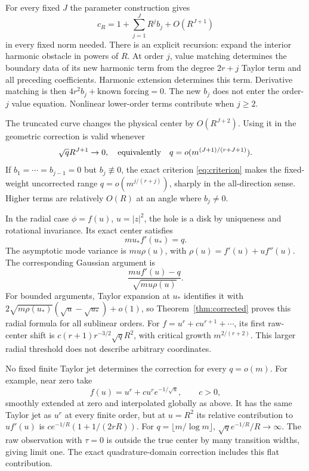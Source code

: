 \documentclass[11pt]{article}
\theoremstyle{remark}\newtheorem{remark}[theorem]{Remark}
\begin{document}
For every fixed $J$ the parameter construction gives
\[
 c_R=1+\sum_{j=1}^J R^j b_j+O(R^{J+1})
\]
in every fixed norm needed. There is an explicit recursion: expand the
interior harmonic obstacle in powers of $R$. At order $j$, value
matching determines the boundary data of its new harmonic term from
the degree $2r+j$ Taylor term and all preceding coefficients. Harmonic
extension determines this term. Derivative matching is then
$4r^2b_j+\text{known forcing}=0$. The new $b_j$ does not enter the
order-$j$ value equation. Nonlinear lower-order terms contribute when
$j\geq2$.

The truncated curve changes the physical center by $O(R^{J+2})$.
Using it in the geometric correction is valid whenever
\[
 \sqrt q R^{J+1}\to0,
 \quad\hbox{equivalently}\quad
 q=o(m^{(J+1)/(r+J+1)}).
\]
If $b_1=\cdots=b_{j-1}=0$ but $b_j\not\equiv0$, the exact criterion
\eqref{eq:criterion} makes the fixed-weight uncorrected range
$q=o(m^{j/(r+j)})$, sharply in the all-direction sense. Higher terms
are relatively $O(R)$ at an angle where $b_j\ne0$.

In the radial case $\phi=f(u)$, $u=|z|^2$, the hole is a disk by
uniqueness and rotational invariance. Its exact center satisfies
\[
 m u_*f'(u_*)=q.
\]
The asymptotic mode variance is $m u\rho(u)$, with
$\rho(u)=f'(u)+uf''(u)$. The corresponding Gaussian argument is
\begin{equation}\label{eq:radialarg}
 \frac{m u f'(u)-q}{\sqrt{m u\rho(u)}}.
\end{equation}
For bounded arguments, Taylor expansion at $u_*$ identifies it with
$2\sqrt{m\rho(u_*)}(\sqrt u-\sqrt{u_*})+o(1)$, so
Theorem~\ref{thm:corrected} proves this radial formula for all sublinear
orders. For $f=u^r+c u^{r+1}+\cdots$, its first raw-center shift is
$c(r+1)r^{-3/2}\sqrt q R^2$, with critical growth $m^{2/(r+2)}$.
This larger radial threshold does not describe arbitrary coordinates.

No fixed finite Taylor jet determines the correction for every
$q=o(m)$. For example, near zero take
\[
 f(u)=u^r+c u^r e^{-1/\sqrt u},\qquad c>0,
\]
smoothly extended at zero and interpolated globally as above.
It has the same Taylor jet as $u^r$ at every finite order, but at
$u=R^2$ its relative contribution to $uf'(u)$ is
$c e^{-1/R}(1+1/(2rR))$. For $q=\lfloor m/\log m\rfloor$,
$\sqrt q e^{-1/R}/R\to\infty$. The raw observation with $\tau=0$
is outside the true center by many transition widths, giving limit one.
The exact quadrature-domain correction includes this flat contribution.
\end{document}

